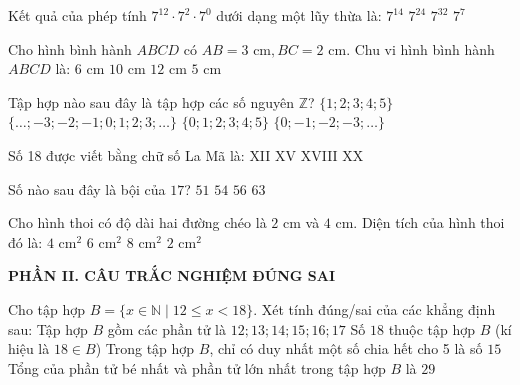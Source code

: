 \documentclass[12pt,a4paper]{article}
\begin{document}
\begin{ex}
Kết quả của phép tính $7^{12} \cdot 7^2 \cdot 7^0$ dưới dạng một lũy thừa là:
\choice
{\True $7^{14}$}
{$7^{24}$}
{$7^{32}$}
{$7^7$}
\end{ex}

\begin{ex}
Cho hình bình hành $ABCD$ có $AB = 3\text{ cm}, BC = 2\text{ cm}$. Chu vi hình bình hành $ABCD$ là:
\choice
{$6\text{ cm}$}
{\True $10\text{ cm}$}
{$12\text{ cm}$}
{$5\text{ cm}$}
\end{ex}

\begin{ex}
Tập hợp nào sau đây là tập hợp các số nguyên $\mathbb{Z}$?
\choice
{$\{1; 2; 3; 4; 5\}$}
{\True $\{\dots; -3; -2; -1; 0; 1; 2; 3; \dots\}$}
{$\{0; 1; 2; 3; 4; 5\}$}
{$\{0; -1; -2; -3; \dots\}$}
\end{ex}

\begin{ex}
Số 18 được viết bằng chữ số La Mã là:
\choice
{XII}
{XV}
{\True XVIII}
{XX}
\end{ex}

\begin{ex}
Số nào sau đây là bội của $17$?
\choice
{\True $51$}
{$54$}
{$56$}
{$63$}
\end{ex}

\begin{ex}
Cho hình thoi có độ dài hai đường chéo là $2\text{ cm}$ và $4\text{ cm}$. Diện tích của hình thoi đó là:
\choice
{\True $4\text{ cm}^2$}
{$6\text{ cm}^2$}
{$8\text{ cm}^2$}
{$2\text{ cm}^2$}
\end{ex}


\setcounter{ex}{0}
\vspace{2mm}
\noindent\textbf{\large PHẦN II. CÂU TRẮC NGHIỆM ĐÚNG SAI}
\vspace{1mm}
\begin{ex}
Cho tập hợp $B = \{x \in \mathbb{N} \mid 12 \le x < 18\}$. Xét tính đúng/sai của các khẳng định sau:
\choiceTF
{\True Tập hợp $B$ gồm các phần tử là $12; 13; 14; 15; 16; 17$}
{Số $18$ thuộc tập hợp $B$ (kí hiệu là $18 \in B$)}
{\True Trong tập hợp $B$, chỉ có duy nhất một số chia hết cho 5 là số $15$}
{\True Tổng của phần tử bé nhất và phần tử lớn nhất trong tập hợp $B$ là $29$}
\end{ex}
\end{document}
